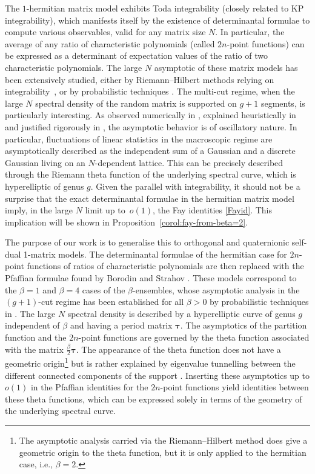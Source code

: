 \documentclass[pdftex]{sigma}
\numberwithin{equation}{section}
\begin{document}
The $1$-hermitian matrix model exhibits Toda integrability (closely related to KP integrability), which manifests itself by the existence of determinantal formulae to compute various observables, valid for any matrix size $N$. In particular, the average of any ratio of characteristic polynomials (called $2n$-point functions) can be expressed as a determinant of expectation values of the ratio of two characteristic polynomials. The large $N$ asymptotic of these matrix models has been extensively studied, either by Riemann--Hilbert methods relying on integrability~\mbox{\cite{CFWW,CGmL, Pastur06}}, or by probabilistic techniques \cite{APS01,BG11,BGmulti,BGK,Johan,Smulticut}. The multi-cut regime, when the large $N$ spectral density of the random matrix is supported on $g + 1$ segments, is particularly interesting. As observed numerically in \cite{Jur91}, explained heuristically in \cite{BDE} and justified rigorously in \cite{BGmulti,Smulticut}, the asymptotic behavior is of oscillatory nature. In particular, fluctuations of linear statistics in the macroscopic regime are asymptotically described as the independent sum of a Gaussian and a discrete Gaussian living on an $N$-dependent lattice. This can be precisely described through the Riemann theta function of the underlying spectral curve, which is hyperelliptic of genus $g$. Given the parallel with integrability, it should not be a surprise that the exact determinantal formulae in the hermitian matrix model imply, in the large $N$ limit up to~$o(1)$, the Fay identities \eqref{Fayid}. This implication will be shown in Proposition~\ref{corol:fay-from-beta=2}.

The purpose of our work is to generalise this to orthogonal and quaternionic self-dual 1-matrix models. The determinantal formulae of the hermitian case for $2n$-point functions of ratios of characteristic polynomials are then replaced with the Pfaffian formulae found by Borodin and Strahov \cite{borodin_averages}. These models correspond to the $\beta = 1$ and $\beta = 4$ cases of the $\beta$-ensembles, whose asymptotic analysis in the $(g+1)$-cut regime has been established for all $\beta > 0$ by probabilistic techniques in \cite{BGmulti,BGK,Smulticut}. The large $N$ spectral density is described by a hyperelliptic curve of genus $g$ independent of $\beta$ and having a period matrix $\bm{\tau}$. The asymptotics of the partition function and the $2n$-point functions are governed by the theta function associated with the matrix $\frac{\beta}{2} \bm{\tau}$. The appearance of the theta function does not have a geometric origin\footnote{The asymptotic analysis carried via the Riemann--Hilbert method does give a geometric origin to the theta function, but it is only applied to the hermitian case, i.e., $\beta = 2$.} but is rather explained by eigenvalue tunnelling between the different connected components of the support \cite{BDE}. Inserting these asymptotics up to $o(1)$ in the Pfaffian identities for the $2n$-point functions yield identities between these theta functions, which can be expressed solely in terms of the geometry of the underlying spectral curve.
\end{document}
